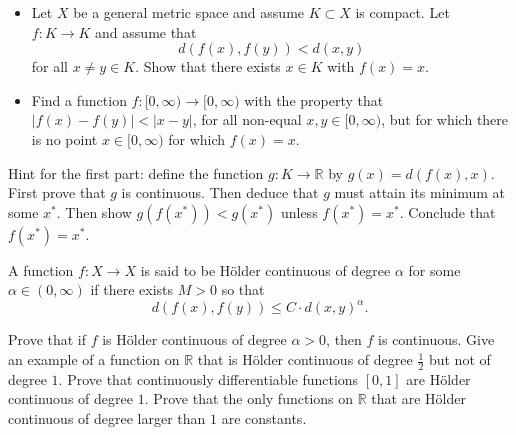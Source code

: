   \begin{exercise}
    \begin{itemize}
      \item Let $X$ be a general metric space and assume $K \subset X$ is compact. Let $f : K \to K$ and assume that
      \begin{equation}
        d(f(x), f(y)) < d(x, y)
      \end{equation}
      for all $x \neq y \in K$. Show that there exists $x \in K$ with $f(x) = x$.
      
      \item Find a function $f : [0, \infty) \to [0, \infty)$ with the property that $|f(x) - f(y)| < |x - y|$, for all non-equal $x, y \in [0, \infty)$, but for which there is no point $x \in [0, \infty)$ for which $f(x) = x$.
    \end{itemize}
    
    Hint for the first part: define the function $g : K \to \mathbb{R}$ by $g(x) = d(f(x), x)$. First prove that $g$ is continuous. Then deduce that $g$ must attain its minimum at some $x^*$. Then show $g(f(x^*)) < g(x^*)$ unless $f(x^*) = x^*$. Conclude that $f(x^*) = x^*$.
  \end{exercise}
  \begin{solution}

  \end{solution}

  \begin{exercise}
    A function $f : X \to X$ is said to be Hölder continuous of degree $\alpha$ for some $\alpha \in (0, \infty)$ if there exists $M > 0$ so that
    \begin{equation}
      d(f(x), f(y)) \leq C \cdot d(x, y)^{\alpha}.
    \end{equation}
    
    Prove that if $f$ is Hölder continuous of degree $\alpha > 0$, then $f$ is continuous. Give an example of a function on $\mathbb{R}$ that is Hölder continuous of degree $\frac{1}{2}$ but not of degree $1$. Prove that continuously differentiable functions $[0,1]$ are Hölder continuous of degree $1$. Prove that the only functions on $\mathbb{R}$ that are Hölder continuous of degree larger than $1$ are constants.
  \end{exercise}
  \begin{solution}

  \end{solution}

